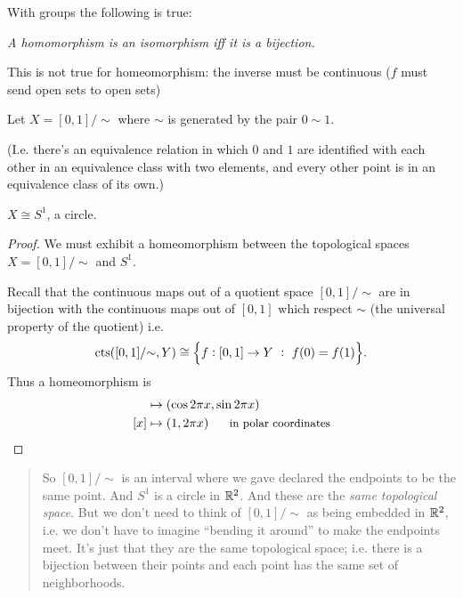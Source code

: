 \begin{remark}
  With groups the following is true:

  {\it A homomorphism is an isomorphism iff it is a bijection.}

  This is not true for homeomorphism: the inverse must be continuous ($f$ must send open sets to open sets)
\end{remark}

\begin{example}
  Let $X = [0, 1]/{\sim}$ where $\sim$ is generated by the pair $0 \sim 1$.

  (I.e. there's an equivalence relation in which $0$ and $1$ are identified with each other in an equivalence
  class with two elements, and every other point is in an equivalence class of its own.)

  \begin{lemma}
     $X \cong S^1$, a circle.
  \end{lemma}

  \begin{proof}
    We must exhibit a homeomorphism between the topological spaces $X = [0, 1]/{\sim}$ and $S^1$.

    Recall that the continuous maps out of a quotient space $[0, 1]/{\sim}$ are in bijection with the
    continuous maps out of $[0, 1]$ which respect $\sim$ (the universal property of the quotient) i.e.
    \begin{align*}
      \text{cts}([0, 1]/{\sim}, Y) \cong \Big\{f: [0, 1] \to Y ~:~ f(0) = f(1)\Big\}.
    \end{align*}
    Thus a homeomorphism is
    \begin{align*}
      [x] &\mapsto (\cos 2\pi x, \sin 2 \pi x) \\
      [x] &\mapsto (1, 2\pi x) ~~~~~\text{\small in polar coordinates}
    \end{align*}
  \end{proof}

  \begin{quote}
    So $[0, 1]/{\sim}$ is an interval where we gave declared the endpoints to be the same point.
    And $S^1$ is a circle in $\mathbb{R}^2$. And these are the {\it same topological space}. But we don't need to think
    of $[0, 1]/{\sim}$ as being embedded in $\mathbb{R}^2$, i.e. we don't have to imagine ``bending it
    around​'' to make the endpoints meet. It's just that they are the same topological space; i.e.
    there is a bijection between their points and each point has the same set of neighborhoods.
  \end{quote}
\end{example}

